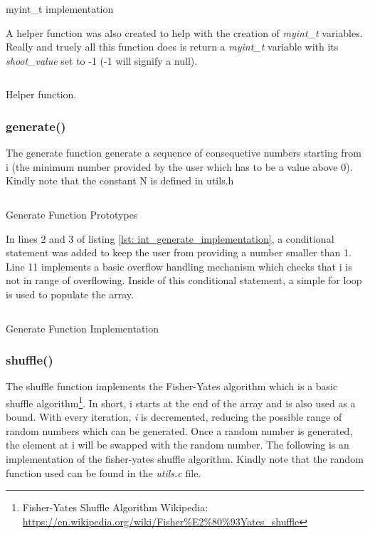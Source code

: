 \documentclass[a4paper, 12pt, titlepage]{article}
\newenvironment{code}{\captionsetup{type=listing}}{}
\newcommand{\sourcecode}[3]{
    \begin{code}
      \inputminted[linenos,numbersep=5pt,gobble=0,frame=lines,framesep=2mm,]{c}{#1}
        \caption{#2}
        \label{lst: #3}
    \end{code}
  }
\begin{document}
\begin{onehalfspacing}
\sourcecode{snippets/myint_t.c}{myint\_t implementation}{myint_t}

A helper function was also created to help with the creation of \emph{myint\_t} variables. Really and truely all this function does is return a \emph{myint\_t} variable with its \emph{shoot\_value} set to -1 (-1 will signify a null).

\sourcecode{snippets/myint_t_create_t.c}{Helper function.}{create_t}

\clearpage

  \subsubsection{generate()}
  The generate function generate a sequence of consequetive numbers starting from i (the minimum number provided by the user which has to be a value above 0). Kindly note that the constant N is defined in utils.h

  \sourcecode{snippets/generate_header.c}{Generate Function Prototypes}{int_generate_header}

  In lines 2 and 3 of listing \ref{lst: int_generate_implementation}, a conditional statement was added to keep the user from providing a number smaller than 1. Line 11 implements a basic overflow handling mechanism which checks that i is not in range of overflowing. Inside of this conditional statement, a simple for loop is used to populate the array.

  \sourcecode{snippets/generate_implementation.c}{Generate Function Implementation}{int_generate_implementation}

  \subsubsection{shuffle()}
  The shuffle function implements the Fisher-Yates algorithm which is a basic shuffle algorithm\footnote{Fisher-Yates Shuffle Algorithm Wikipedia: \url{https://en.wikipedia.org/wiki/Fisher\%E2\%80\%93Yates_shuffle}}. In short, i starts at the end of the array and is also used as a bound. With every iteration, \emph{i} is decremented, reducing the possible range of random numbers which can be generated. Once a random number is generated, the element at i will be swapped with the random number. The following is an implementation of the fisher-yates shuffle algorithm. Kindly note that the random function used can be found in the \emph{utils.c} file.

  \clearpage


\end{onehalfspacing}
\end{document}
